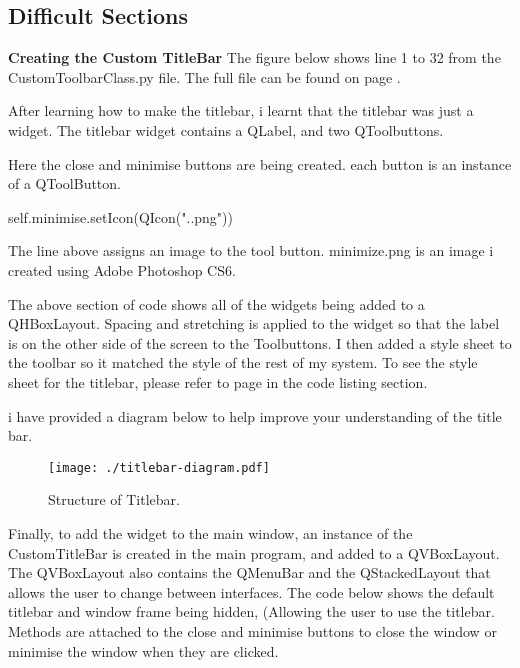 \subsection{Difficult Sections}

\textbf{Creating the Custom TitleBar} The figure below shows line 1 to 32 from the CustomToolbarClass.py file. The full file can be found on page \pageref{fig:CustomToolbarClass}.


After learning how to make the titlebar, i learnt that the titlebar was just a widget. The titlebar widget contains a QLabel, and two QToolbuttons.


Here the close and minimise buttons are being created. each button is an instance of a QToolButton. 

\begin{python}
self.minimise.setIcon(QIcon(".\SystemImages\minimize.png"))
\end{python}

The line above assigns an image to the tool button. minimize.png is an image i created using Adobe Photoshop CS6.


The above section of code shows all of the widgets being added to a QHBoxLayout. Spacing and stretching is applied to the widget so that the label is on the other side of the screen to the Toolbuttons. I then added a style sheet to the toolbar so it matched the style of the rest of my system. To see the style sheet for the titlebar, please refer to page \pageref{fig:CustomToolbarClass} in the code listing section. \par

i have provided a diagram below to help improve your understanding of the title bar.



\begin{figure}[H]
    \texttt{[image: ./titlebar-diagram.pdf]}
    \caption{Structure of Titlebar.} \label{fig:titlebar-diagram}
\end{figure}

Finally, to add the widget to the main window, an instance of the CustomTitleBar is created in the main program, and added to a QVBoxLayout. The QVBoxLayout also contains the QMenuBar and the QStackedLayout that allows the user to change between interfaces. The code below shows the default titlebar and window frame being hidden, (Allowing the user to use the titlebar. Methods are attached to the close and minimise buttons to close the window or minimise the window when they are clicked.

